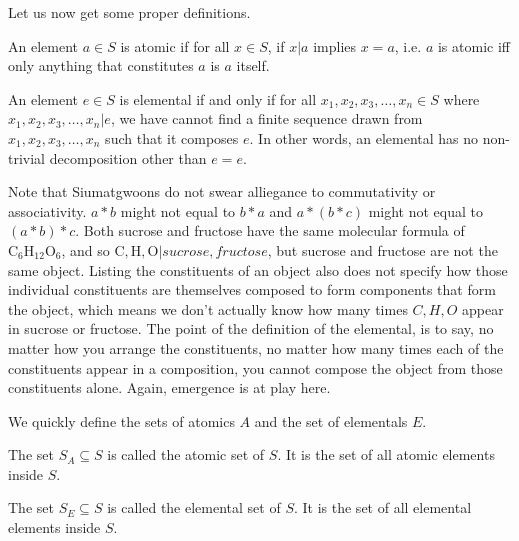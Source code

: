 Let us now get some proper definitions.


\begin{definition}[Atomics]\label{def:atomics}
    An element $a \in S$ is atomic if for all $x\in S$, if $x|a$ implies $x=a$, i.e. $a$ is atomic iff only anything that constitutes $a$ is $a$ itself.
\end{definition}

\begin{definition}[Elementals]\label{def:elementals}
    An element $e \in S$ is elemental if and only if for all $x_1, x_2, x_3, \ldots, x_n \in S$ where $x_1, x_2, x_3, \ldots, x_n | e$, we have cannot find a finite sequence drawn from $x_1, x_2, x_3,\ldots, x_n $ such that it composes $e$. In other words, an elemental has no non-trivial decomposition other than $e = e$. 
\end{definition}


Note that Siumatgwoons do not swear alliegance to commutativity or associativity. $a*b$ might not equal to $b*a$ and $a*(b*c)$ might not equal to $(a*b)*c$. Both sucrose and fructose have the same molecular formula of $\text{C}_6\text{H}_{12}\text{O}_6$, and so $\text{C}, \text{H}, \text{O} | sucrose, fructose$, but sucrose and fructose are not the same object. Listing the constituents of an object also does not specify how those individual constituents are themselves composed to form components that form the object, which means we don't actually know how many times $C, H, O$ appear in sucrose or fructose. The point of the definition of the elemental, is to say, no matter how you arrange the constituents, no matter how many times each of the constituents appear in a composition, you cannot compose the object from those constituents alone. Again, emergence is at play here.



We quickly define the sets of atomics $A$ and the set of elementals $E$.

\begin{definition}\label{def:atomic-set}
    The set $S_A \subseteq S$ is called the atomic set of $S$. It is the set of all atomic elements inside $S$.
\end{definition}

\begin{definition}\label{def:elemental-set}
    The set $S_E \subseteq S$ is called the elemental set of $S$. It is the set of all elemental elements inside $S$.
\end{definition}



